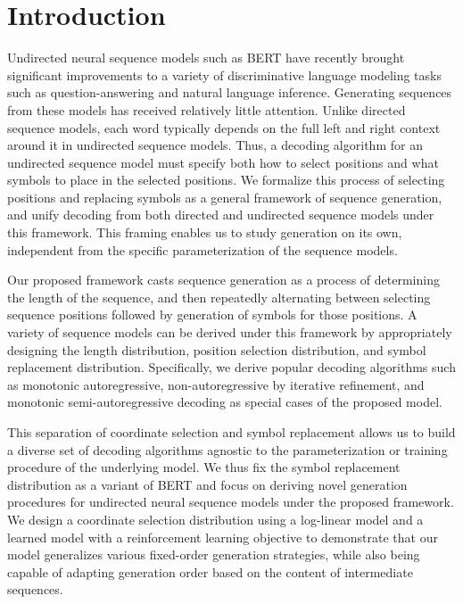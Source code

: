\documentclass{article}
\begin{document}
\section{Introduction}

Undirected neural sequence models such as BERT \citep{devlin2019bert} have recently brought significant improvements to a variety of discriminative language modeling tasks such as question-answering and natural language inference. Generating sequences from these models has received relatively little attention. Unlike directed sequence models, each word typically depends on the full left and right context around it in undirected sequence models. Thus, a decoding algorithm for an undirected sequence model must specify both how to select positions and what symbols to place in the selected positions. 
We formalize this process of selecting positions and replacing symbols as a general framework of sequence generation, 
and unify decoding from both directed and undirected sequence models under this framework. This framing enables us to study generation on its own, independent from the specific parameterization of the sequence models. 

Our proposed framework casts sequence generation as a process of determining the length of the sequence, and then repeatedly alternating between selecting sequence positions followed by generation of symbols for those positions. A variety of sequence models can be derived under this framework by appropriately designing the length distribution, position selection distribution, and symbol replacement distribution. Specifically, we derive popular decoding algorithms such as monotonic autoregressive, non-autoregressive by iterative refinement, and monotonic semi-autoregressive decoding as special cases of the proposed model.

This separation of coordinate selection and symbol replacement allows us to build a diverse set of decoding algorithms agnostic to the parameterization or training procedure of the underlying model.
We thus fix the symbol replacement distribution as a variant of BERT and focus on deriving novel generation procedures for undirected neural sequence models under the proposed framework. 
We design a coordinate selection distribution using a log-linear model and a learned model with a reinforcement learning objective to demonstrate that our model generalizes various fixed-order generation strategies, while also being capable of adapting generation order based on the content of intermediate sequences. 
\end{document}
